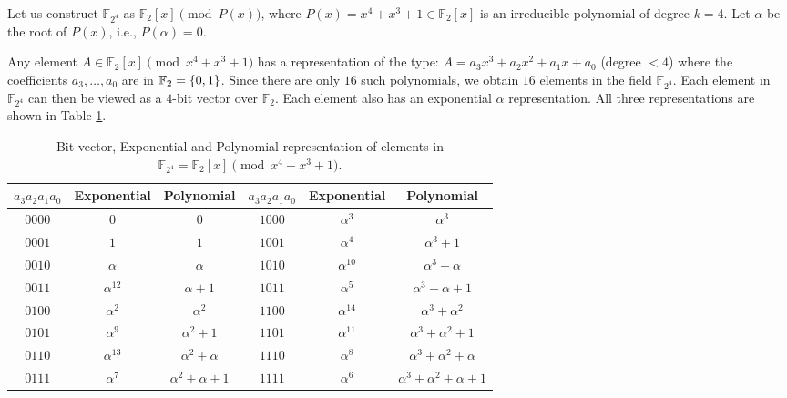 \begin{Example}\label{exp:1}
Let us construct $\mathbb{F}_{2^4}$ as $\mathbb{F}_2[x] \pmod{ P(x)}$, where
$P(x)=x^4+x^3+1 \in \mathbb{F}_2[x]$ is an irreducible polynomial of degree $k=4$. 
Let $\alpha$ be the root of $P(x)$, i.e., $P(\alpha)=0$. 

Any element $A \in \mathbb{F}_2[x] \pmod{ x^4 + x^3 + 1}$
has a representation of the type: $A = a_3 x^3 + a_2 x^2 +
a_1 x + a_0$ (degree $< 4$) where the coefficients $a_3, \dots, a_0$ are in ${\mathbb{F}}_2 =
\{0, 1\}$. Since there are only $16$ such polynomials, we obtain
$16$ elements in the field $\mathbb{F}_{2^4}$. Each element in
$\mathbb{F}_{2^4}$ can then be viewed as a $4$-bit vector over $\mathbb{F}_{2}$. 
Each element also has an exponential $\alpha$
representation. All three representations are shown in Table
\ref{tab:gfelement}.

\begin{table}[bp]
\begin{center}
\caption{Bit-vector, Exponential and Polynomial representation of
elements in  $\mathbb{F}_{2^4} = \mathbb{F}_2[x] \pmod{x^4+x^3+1}$.}\label{tab:gfelement} 
\begin{tabular}{|c|c|c||c|c|c|} 
\hline
$a_3a_2a_1a_0$ & Exponential & Polynomial     &$a_3a_2a_1a_0$ & Exponential & Polynomial  \\
\hline
$0000$        & $0$         & $0$            & $1000$ & $\alpha^3$ &  $\alpha^3$\\
\hline
$0001$        & $1$         & $1$            & $1001$ & $\alpha^4$ & $\alpha^3 + 1$\\
\hline
$0010$        & $\alpha$    & $\alpha$       & $1010$ & $\alpha^{10}$&$\alpha^3 + \alpha$  \\
\hline
$0011$        & $\alpha^{12}$& $\alpha + 1$   & $1011$ & $\alpha^5$ & $\alpha^3+\alpha+1$\\
\hline
$0100$        & $\alpha^2$  & $\alpha^2$     &  $1100$ & $\alpha^{14}$ & $\alpha^3 + \alpha^2$\\
\hline
$0101$        & $\alpha^9$   &$\alpha^2 + 1$ & $1101$  &$\alpha^{11}$  & $\alpha^3+\alpha^2+1$\\
\hline
$0110$        & $\alpha^{13}$& $\alpha^2 + \alpha$ & $1110$ & $\alpha^8$& $\alpha^3+\alpha^2+\alpha$\\
\hline
$0111$        &$\alpha^7 $ & $\alpha^2+\alpha+1$ & $1111$ &$\alpha^6$ & $\alpha^3+\alpha^2+\alpha+1$\\
\hline
\end{tabular}
\end{center}
\end{table}


\end{Example}
